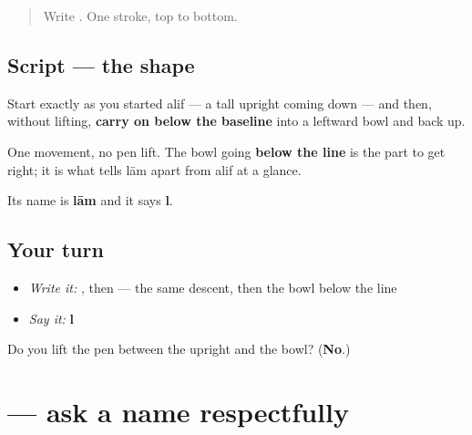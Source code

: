\label{lesson:UR-W03-lam}



\begin{quote}
Write . One stroke, top to bottom.
\end{quote}

\subsection*{Script — the shape}

\begin{quote}
\end{quote}

Start exactly as you started alif — a tall upright coming down — and then, without lifting, \textbf{carry on below the baseline} into a leftward bowl and back up.

One movement, no pen lift. The bowl going \textbf{below the line} is the part to get right; it is what tells lām apart from alif at a glance.

Its name is \textbf{lām} and it says \textbf{l}.

\subsection*{Your turn}
\begin{itemize}
\raggedright
  \item \emph{Write it:} , then  — the same descent, then the bowl below the line
  \item \emph{Say it:} \textbf{l}
\end{itemize}

\begin{tcolorbox}[breakable,colback=teal!4,colframe=teal!35!black,title={Before you move on}]
Do you lift the pen between the upright and the bowl? (\textbf{No}.)
\end{tcolorbox}
\section[\texorpdfstring{\ur{آپ} \ur{کا} \ur{نام} \ur{کیا} \ur{ہے؟} (āp kā nām kyā hai?)}{آپ کا نام کیا ہے؟ (āp kā nām kyā hai?)}]{     — ask a name respectfully}

\label{lesson:UR-C03-aap-ka-naam-kya-hai}



